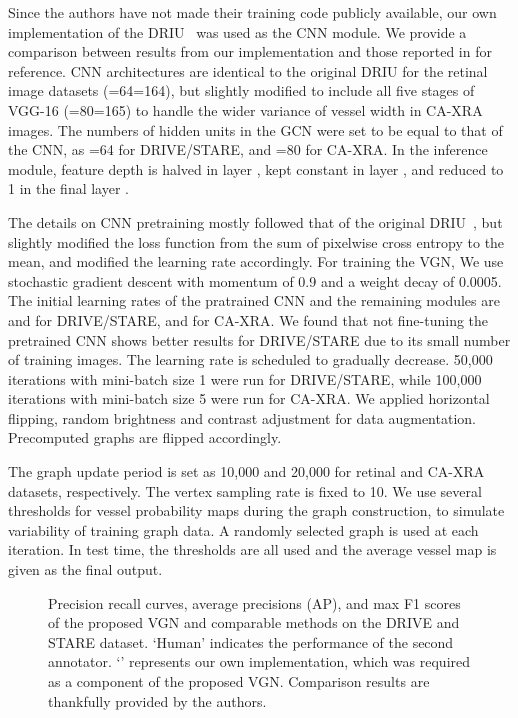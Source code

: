 \documentclass[runningheads,a4paper]{llncs}
\begin{document}
Since the authors have not made their training code publicly available, our own implementation of the DRIU~\cite{maninis16} was used as the CNN module. We provide a comparison between results from our implementation and those reported in \cite{maninis16} for reference. CNN architectures are identical to the original DRIU for the retinal image datasets (=64=164), but slightly modified to include all five stages of VGG-16 (=80=165) to handle the wider variance of vessel width in CA-XRA images.
The numbers of hidden units in the GCN were set to be equal to that of the CNN, as =64 for DRIVE/STARE, and =80 for CA-XRA. In the inference module, feature depth is halved in layer , kept constant in layer , and reduced to 1 in the final layer .

The details on CNN pretraining mostly followed that of the original DRIU~\cite{maninis16}, but slightly modified the loss function from the sum of pixelwise cross entropy to the mean, and modified the learning rate accordingly. For training the VGN, We use stochastic gradient descent with momentum of 0.9 and a weight decay of 0.0005. The initial learning rates of the pratrained CNN and the remaining modules are  and  for DRIVE/STARE,  and  for CA-XRA. We found that not fine-tuning the pretrained CNN shows better results for DRIVE/STARE due to its small number of training images. The learning rate is scheduled to gradually decrease. 50,000 iterations with mini-batch size 1 were run for DRIVE/STARE, while 100,000 iterations with mini-batch size 5 were run for CA-XRA. We applied horizontal flipping, random brightness and contrast adjustment for data augmentation. Precomputed graphs are flipped accordingly. 

The graph update period  is set as 10,000 and 20,000 for retinal and CA-XRA datasets, respectively. The vertex sampling rate  is fixed to 10. We use several thresholds for vessel probability maps during the graph construction, to simulate variability of training graph data. A randomly selected graph is used at each iteration.
In test time, the thresholds are all used and the average vessel map is given as the final output.

\begin{figure*}[t]
	\centering
	\begin{minipage}{1\linewidth}
	\end{minipage}
	\caption{Precision recall curves, average precisions (AP), and max F1 scores of the proposed VGN and comparable methods on the DRIVE and STARE dataset. `Human' indicates the performance of the second annotator. `' represents our own implementation, which was required as a component of the proposed VGN. Comparison results are thankfully provided by the authors.}
	\label{fig:quan_res}
\end{figure*}
\end{document}
